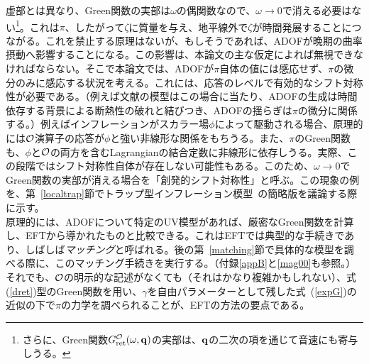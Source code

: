 虚部とは異なり、Green関数の実部は$\omega$の偶関数なので、$\omega \to 0$で消える必要はない\footnote{さらに、Green関数$G^{\cal O}_{\rm ret}(\omega,{\bf q})$の実部は、${\bf q}$の二次の項を通じて音速にも寄与しうる。}。これは$\pi$、したがって$\zeta$に質量を与え、地平線外で$\zeta$が時間発展することにつながる。これを禁止する原理はないが、もしそうであれば、ADOFが晩期の曲率摂動へ影響することになる。この影響は、本論文の主な仮定によれば無視できなければならない。そこで本論文では、ADOFが$\pi$自体の値には感応せず、$\pi$の微分のみに感応する状況を考える。これには、応答のレベルで有効的なシフト対称性が必要である。（例えば文献\cite{trapped}の模型はこの場合に当たり、ADOFの生成は時間依存する背景による断熱性の破れ\cite{beauty}と結びつき、ADOFの揺らぎは$\pi$の微分に関係する。）例えばインフレーションがスカラー場$\phi$によって駆動される場合、原理的には${\cal O}$演算子の応答が$\phi$と強い非線形な関係をもちうる。また、$\pi$のGreen関数も、$\phi$と${\cal O}$の両方を含むLagrangianの結合定数に非線形に依存しうる。実際、この段階ではシフト対称性自体が存在しない可能性もある。このため、$\omega\rightarrow 0$でGreen関数の実部が消える場合を「創発的シフト対称性」と呼ぶ。この現象の例を、第~\ref{localtrap}節でトラップ型インフレーション模型~\cite{trapped}の簡略版を議論する際に示す。\\

原理的には、ADOFについて特定のUV模型があれば、厳密なGreen関数を計算し、EFTから導かれたものと比較できる。これはEFTでは典型的な手続きであり、しばしば{\it マッチング}と呼ばれる\cite{iraeft}。後の第~\ref{matching}節で具体的な模型を調べる際に、このマッチング手続きを実行する。（付録\ref{appB}と\ref{mag00}も参照。）それでも、${\cal O}$の明示的な記述がなくても（それはかなり複雑かもしれない）、式(\ref{dret})型のGreen関数を用い、$\gamma$を自由パラメーターとして残した式~(\ref{expG})の近似の下で$\pi$の力学を調べられることが、EFTの方法の要点である。\\

